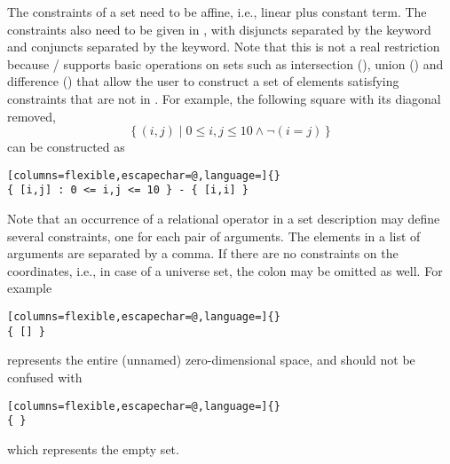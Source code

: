 The constraints of a set need to be affine, i.e., linear plus constant term.
The constraints also need to be given in , with disjuncts
separated by the  keyword and conjuncts separated
by the  keyword.
Note that this is not a real restriction because \iscc/ supports
basic operations on sets such as intersection (\ai[\tt]{*}),
union (\ai[\tt]{+}) and difference (\ai[\tt]{-}) that allow
the user to construct a set of elements satisfying constraints that
are not in .
For example, the following square with its diagonal removed,
$$
\{\,
(i,j) \mid 0 \le i,j \le 10 \wedge \lnot (i = j)
\,\}
$$
can be constructed as
\begin{lstlisting}[columns=flexible,escapechar=@,language=]{}
{ [i,j] : 0 <= i,j <= 10 } - { [i,i] }
\end{lstlisting}
Note that an occurrence of a relational operator in a set description
may define several constraints, one for each pair of arguments.
The elements in a list of arguments are separated by a comma.
If there are no constraints on the coordinates, i.e., in case of
a universe set, the colon may be omitted as well.
For example
\begin{lstlisting}[columns=flexible,escapechar=@,language=]{}
{ [] }
\end{lstlisting}
represents the entire (unnamed) zero-dimensional space,
and should not be confused with
\begin{lstlisting}[columns=flexible,escapechar=@,language=]{}
{ }
\end{lstlisting}
which represents the empty set.

